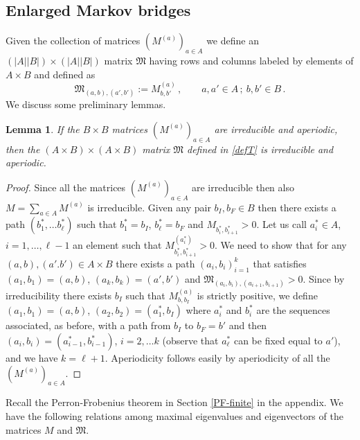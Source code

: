 \documentclass[reqno]{amsart}
\theoremstyle{plain}
\newtheorem{lemma}[theorem]{Lemma}
\theoremstyle{definition}
\theoremstyle{remark}
\numberwithin{equation}{section}
\numberwithin{theorem}{section}
\newcommand{\<}{\langle}
\renewcommand{\>}{\rangle}
\begin{document}
	\smallskip
	
	\subsection{Enlarged Markov bridges}\label{sec:bridge}
	
	Given the collection of matrices $(M^{(a)})_{a\in A}$ we define an $\left(|A||B|\right)\times \left(|A||B|\right)$ matrix $\mathfrak M$ having rows and columns labeled by elements of $A\times B$ and defined as
	\begin{equation}\label{defT}
		\mathfrak M_{(a,b),(a',b')}:=M^{(a)}_{b,b'}\,, \qquad a,a'\in A\,;\ b,b'\in B\,.
	\end{equation}
	We discuss some preliminary lemmas.
	
	\begin{lemma}\label{lemmaT}
		If the $B\times B$ matrices $(M^{(a)})_{a\in A}$ are irreducible and aperiodic, then the $(A\times B)\times (A\times B)$ matrix $\mathfrak M$ defined in \eqref{defT} is irreducible and aperiodic.
	\end{lemma}
	\begin{proof}
		Since all the matrices $(M^{(a)})_{a\in A}$ are irreducible then also $M=\sum_{a\in A}M^{(a)}$ is irreducible. Given any pair $b_I,b_F\in B$ then there exists a path $(b^*_1,\dots b^*_\ell)$ such that $b^*_1=b_I$, $b^*_\ell=b_F$ and $M_{b^*_i,b^*_{i+1}}>0$. Let us call $a^*_i\in A$, $i=1,\dots,\ell-1$ an element such that $M^{(a^*_i)}_{b^*_i,b^*_{i+1}}>0$. We need to show that for any $(a,b),(a'.b')\in A\times B$ there exists a path $(a_i,b_i)_{i=1}^k$ that satisfies  $(a_1,b_1)=(a,b)$, $(a_k,b_k)=(a',b')$ and $\mathfrak M_{(a_i,b_i),(a_{i+1},b_{i+1})}>0$. Since by irreducibility there exists $b_I$ such that $M^{(a)}_{b,b_I}$ is strictly positive, we define $(a_1,b_1)=(a,b)$, $(a_2,b_2)=(a^*_1,b_I)$ where $a^*_i$ and $b^*_i$ are the sequences associated, as before, with a path from $b_I$ to $b_F=b'$ and then $(a_i,b_i)=(a^*_{i-1},b^*_{i-1})$, $i=2, \dots k$ (observe that $a^*_\ell$ can be fixed equal to $a'$), and we have $k=\ell+1$. Aperiodicity follows easily by aperiodicity of all the $(M^{(a)})_{a\in A}$.
	\end{proof}
	
	Recall the Perron-Frobenius theorem in Section \ref{PF-finite} in the appendix. We have the following relations among maximal eigenvalues and eigenvectors of the matrices $M$ and $\mathfrak M$.
	
\end{document}
